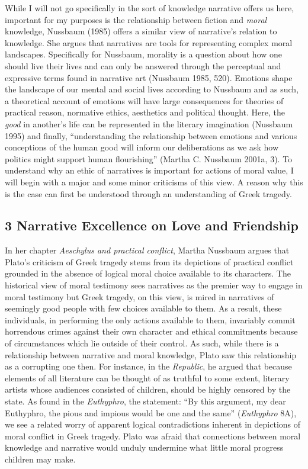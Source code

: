 \documentclass[
  letterpaper,
  DIV=11,
  numbers=noendperiod]{scrartcl}
\theoremstyle{remark}
\begin{document}
While I will not go specifically in the sort of knowledge narrative
offers us here, important for my purposes is the relationship between
fiction and \emph{moral} knowledge, Nussbaum (1985) offers a similar
view of narrative's relation to knowledge. She argues that narratives
are tools for representing complex moral landscapes. Specifically for
Nussbaum, morality is a question about how one should live their lives
and can only be answered through the perceptual and expressive terms
found in narrative art (Nussbaum 1985, 520). Emotions shape the
landscape of our mental and social lives according to Nussbaum and as
such, a theoretical account of emotions will have large consequences for
theories of practical reason, normative ethics, aesthetics and political
thought. Here, the \emph{good} in another's life can be represented in
the literary imagination (Nussbaum 1995) and finally, ``understanding
the relationship between emotions and various conceptions of the human
good will inform our deliberations as we ask how politics might support
human flourishing'' (Martha C. Nussbaum 2001a, 3). To understand why an
ethic of narratives is important for actions of moral value, I will
begin with a major and some minor criticisms of this view. A reason why
this is the case can first be understood through an understanding of
Greek tragedy.

\subsection{3 Narrative Excellence on Love and
Friendship}\label{narrative-excellence-on-love-and-friendship}

In her chapter \emph{Aeschylus and practical conflict}, Martha Nussbaum
argues that Plato's criticism of Greek tragedy stems from its depictions
of practical conflict grounded in the absence of logical moral choice
available to its characters. The historical view of moral testimony sees
narratives as the premier way to engage in moral testimony but Greek
tragedy, on this view, is mired in narratives of seemingly good people
with few choices available to them. As a result, these individuals, in
performing the only actions available to them, invariably commit
horrendous crimes against their own character and ethical commitments
because of circumstances which lie outside of their control. As such,
while there is a relationship between narrative and moral knowledge,
Plato saw this relationship as a corrupting one then. For instance, in
the \emph{Republic}, he argued that because elements of all literature
can be thought of as truthful to some extent, literary artists whose
audiences consisted of children, should be highly censored by the state.
As found in the \emph{Euthyphro}, the statement: ``By this argument, my
dear Euthyphro, the pious and impious would be one and the same''
(\emph{Euthyphro} 8A), we see a related worry of apparent logical
contradictions inherent in depictions of moral conflict in Greek
tragedy. Plato was afraid that connections between moral knowledge and
narrative would unduly undermine what little moral progress children may
make.
\end{document}
